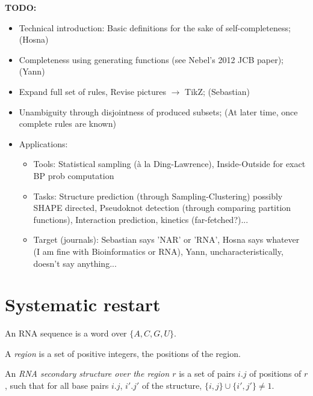 \documentclass[11pt]{article} %
\newcommand{\SW}[1]{\textbf{SW-}#1}
\begin{document}

\newpage
{\bf TODO:}
\begin{itemize}
  \item Technical introduction: Basic definitions for the sake of self-completeness; (Hosna)
  \item Completeness using generating functions (see Nebel's 2012 JCB paper); (Yann)
  \item Expand full set of rules, Revise pictures $\to$ TikZ; (Sebastian)
  \item Unambiguity through disjointness of produced subsets; (At later time, once complete rules are known)
  \item Applications: 
   \begin{itemize}
    \item Tools: Statistical sampling (à la Ding-Lawrence), Inside-Outside for exact BP prob computation
    \item Tasks: Structure prediction (through Sampling-Clustering) possibly SHAPE directed, Pseudoknot detection (through comparing partition functions), Interaction prediction, kinetics (far-fetched?)...
    \item Target (journals): Sebastian says 'NAR' or 'RNA', Hosna says whatever (I am fine with Bioinformatics or RNA), Yann, uncharacteristically, doesn't say anything...
  \end{itemize}
\end{itemize}

\newpage
\section{Systematic restart}
\label{sec:pdecomposition}

\newcommand{\CGR}{CGR} %
\newcommand{\CR}{CR}   %
    

An RNA sequence is a word over $\{A,C,G,U\}.$

A \emph{region} is a set of positive integers, the positions of the region.

An \emph{RNA secondary structure over the region $r$} is a set of pairs $i.j$ of positions of $r$, such that for all base pairs $i.j$, $i'.j'$ of the structure,
$\{i,j\}\cup\{i',j'\}\neq 1.$
\end{document}
